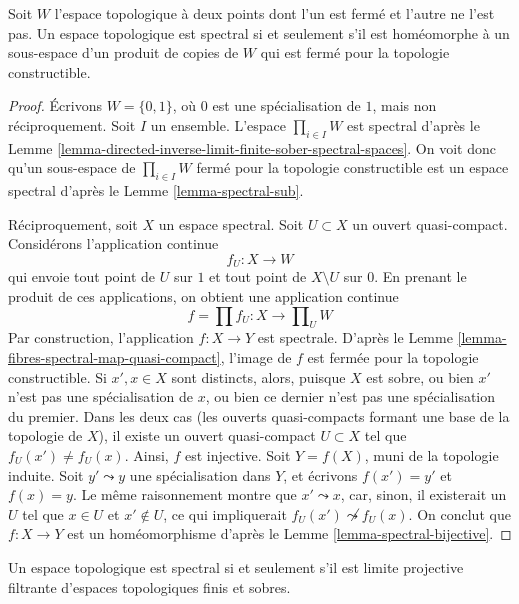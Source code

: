 \begin{lemma}
\label{lemma-spectral-closed-in-product-two-point-space}
Soit $W$ l'espace topologique à deux points dont l'un est fermé et l'autre ne
l'est pas. Un espace topologique est spectral si et seulement s'il est
homéomorphe à un sous-espace d'un produit de copies de $W$ qui est fermé pour
la topologie constructible.
\end{lemma}

\begin{proof}
Écrivons $W = \{0, 1\}$, où $0$ est une spécialisation de $1$, mais non
réciproquement. Soit $I$ un ensemble. L'espace $\prod_{i \in I} W$ est spectral
d'après le
Lemme \ref{lemma-directed-inverse-limit-finite-sober-spectral-spaces}.
On voit donc qu'un sous-espace de $\prod_{i \in I} W$ fermé pour la topologie
constructible est un espace spectral d'après le
Lemme \ref{lemma-spectral-sub}.

\medskip\noindent
Réciproquement, soit $X$ un espace spectral. Soit $U \subset X$ un ouvert
quasi-compact. Considérons l'application continue
$$
f_U : X \longrightarrow W
$$
qui envoie tout point de $U$ sur $1$ et tout point de $X \setminus U$ sur $0$.
En prenant le produit de ces applications, on obtient une application continue
$$
f = \prod f_U : X \longrightarrow \prod\nolimits_U W
$$
Par construction, l'application $f : X \to Y$ est spectrale. D'après le
Lemme \ref{lemma-fibres-spectral-map-quasi-compact}, l'image de $f$ est fermée
pour la topologie constructible. Si $x', x \in X$ sont distincts, alors, puisque
$X$ est sobre, ou bien $x'$ n'est pas une spécialisation de $x$, ou bien
ce dernier n'est pas une spécialisation du premier. Dans les deux cas (les ouverts
quasi-compacts formant une
base de la topologie de $X$), il existe un ouvert quasi-compact $U \subset X$
tel que $f_U(x') \not = f_U(x)$. Ainsi, $f$ est injective. Soit $Y = f(X)$,
muni de la topologie induite. Soit $y' \leadsto y$ une spécialisation dans $Y$,
et écrivons $f(x') = y'$ et $f(x) = y$. Le même raisonnement montre que
$x' \leadsto x$, car, sinon, il existerait un $U$ tel que $x \in U$ et
$x' \not \in U$, ce qui impliquerait
$f_U(x') \not \leadsto f_U(x)$.
On conclut que $f : X \to Y$ est un homéomorphisme d'après le
Lemme \ref{lemma-spectral-bijective}.
\end{proof}

\begin{lemma}
\label{lemma-spectral-inverse-limit-finite-sober-spaces}
Un espace topologique est spectral si et seulement s'il est limite projective
filtrante d'espaces topologiques finis et sobres.
\end{lemma}

